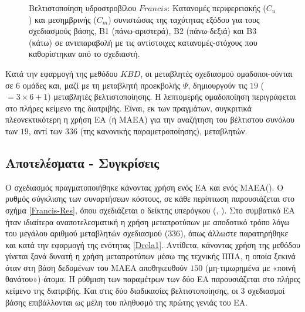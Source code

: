 \begin{figure}[h!]
\begin{minipage}[b]{1\linewidth}
\end{minipage}
\caption{Βελτιστοποίηση υδροστροβίλου $Francis$: Κατανομές περιφερειακής ($C_u$) και μεσημβρινής ($C_m$)  συνιστώσας της ταχύτητας εξόδου για τους σχεδιασμούς βάσης, Β1 (πάνω-αριστερά), Β2 (πάνω-δεξιά) και Β3 (κάτω) σε αντιπαραβολή με τις αντίστοιχες κατανομές-στόχους που καθορίστηκαν από το σχεδιαστή.}
\label{Francis-OUT}
\end{figure}

Κατά την εφαρμογή της μεθόδου $KBD$, οι μεταβλητές σχεδιασμού ομαδοποι-ούνται σε $6$ ομάδες και, μαζί με τη μεταβλητή  προεκβολής
$\Psi$, δημιουργούν τις $19$ ($=3\times6+1$) μεταβλητές βελτιστοποίησης. Η λεπτομερής ομαδοποίηση περιγράφεται στο πλήρες κείμενο της διατριβής. Είναι, εκ των πραγμάτων, συγκριτικά πλεονεκτικότερη η χρήση ΕΑ (ή ΜΑΕΑ) για την αναζήτηση του βέλτιστου συνόλου των $19$, αντί των $336$ (της κανονικής παραμετροποίησης), μεταβλητών.   

\subsection{Αποτελέσματα - Συγκρίσεις}
Ο σχεδιασμός πραγματοποιήθηκε κάνοντας χρήση ενός ΕΑ και ενός ΜΑΕΑ(). Ο ρυθμός σύγκλισης των συναρτήσεων κόστους, σε κάθε περίπτωση παρουσιάζεται στο σχήμα \ref{Francis-Res}, όπου σχεδιάζεται ο δείκτης υπερόγκου (, \cite{Zitz2007}). Στο συμβατικό ΕΑ ήταν ιδιαίτερα αναποτελεσματική η χρήση μεταπροτύπων με αποδοτικό τρόπο λόγω του μεγάλου αριθμού μεταβλητών σχεδιασμού ($336$), όπως άλλωστε παρατηρήθηκε και κατά την εφαρμογή της ενότητας \ref{Drela1}. Αντίθετα, κάνοντας χρήση της μεθόδου  γίνεται ξανά δυνατή η χρήση μεταπροτύπων μέσω της τεχνικής ΠΠΑ, η οποία ξεκινά όταν στη βάση δεδομένων του ΜΑΕΑ αποθηκευθούν $150$ (μη-τιμωρημένα με «ποινή θανάτου») άτομα. Η ρύθμιση των παραμέτρων των δύο ΕΑ παρουσιάζεται στο πλήρες κείμενο της διατριβής. Και στις δύο διαδικασίες βελτιστοποίησης, οι 3 σχεδιασμοί βάσης επιβάλλονται ως μέλη του πληθυσμό της πρώτης γενιάς του ΕΑ.      
          
